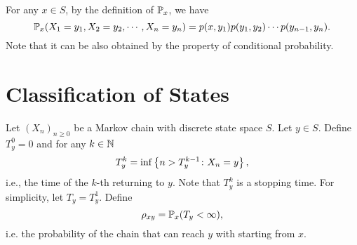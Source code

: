 \begin{rmk}
    For any $x \in S$, by the definition of $\mathbb{P}_x$, we have
    \begin{equation*}
        \mathbb{P}_x(X_1 = y_1,X_2 = y_2,\cdots,X_n = y_n) = p(x,y_1)p(y_1,y_2)\cdots p(y_{n-1},y_n).
    \end{equation*}
    Note that it can be also obtained by the property of conditional probability.
\end{rmk}

\section{Classification of States}

Let $(X_n)_{n \geq 0}$ be a Markov chain with discrete state space $S$. Let $y \in S$. Define $T^0_y = 0$ and for any $k \in \mathbb{N}$
\begin{equation*}
    T^k_y = \inf \left\{n > T^{k-1}_y \colon X_n = y\right\},
\end{equation*}
i.e., the time of the $k$-th returning to $y$. Note that $T^k_y$ is a stopping time. For simplicity, let $T_y = T^1_y$. Define
\begin{equation*}
    \rho_{xy} = \mathbb{P}_x(T_y < \infty),
\end{equation*}
i.e. the probability of the chain that can reach $y$ with starting from $x$.

